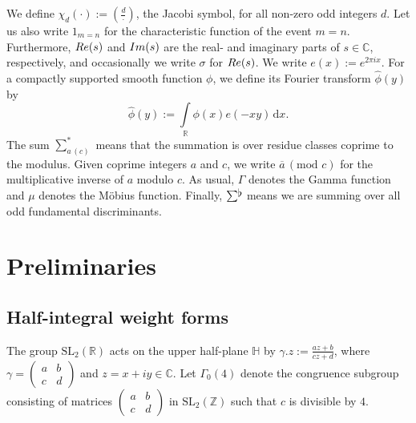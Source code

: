 \documentclass[a4paper,10pt,twoside]{amsart}
\theoremstyle{definition}
\numberwithin{equation}{section}
\newcommand\C{\mathbb{C}}
\renewcommand{\Re}{\textnormal{Re}}
\renewcommand{\Im}{\textnormal{Im}}
\renewcommand\:{\colon}
\newcommand{\sumflat}{\mathop{{\sum}^{\raisebox{-3pt}{\makebox[0pt][l]{$\flat$}}}}}
\begin{document}
We define $\chi_d(\cdot):=\left(\frac d\cdot\right)$, the Jacobi symbol, for all non-zero odd integers $d$. Let us also write $1_{m=n}$ for the characteristic function of the event $m=n$. Furthermore, $\Re(s)$ and $\Im(s)$ are the real- and imaginary parts of $s\in\mathbb C$, respectively, and occasionally we write $\sigma$ for $\Re(s)$. We write $e(x):=e^{2\pi ix}$. For a compactly supported smooth function $\phi$, we define its Fourier transform $\widehat\phi(y)$ by
\[\widehat\phi(y):=\int\limits_\mathbb R \phi(x)e(-xy)\,\mathrm d x. \]
The sum $\sum_{a\,(c)}^*$ means that the summation is over residue classes coprime to the modulus. Given coprime integers $a$ and $c$, we write $\overline a\,(\text{mod } c)$ for the multiplicative inverse of $a$ modulo $c$. As usual, $\Gamma$ denotes the Gamma function and $\mu$ denotes the M\"obius function. Finally, $\sumflat\,\,$ means we are summing over all odd fundamental discriminants. 

\section{Preliminaries}

\subsection{Half-integral weight forms}

\noindent The group $\mathrm{SL}_2(\mathbb R)$ acts on the upper half-plane $\mathbb H$ by $\gamma.z:=\frac{az+b}{cz+d}$, where $\gamma=\begin{pmatrix} a & b\\
c & d
\end{pmatrix}$ and $z=x+iy\in\C$. Let $\Gamma_0(4)$ denote the congruence subgroup consisting of matrices $\begin{pmatrix} a & b\\
c & d
\end{pmatrix}$ in $\mathrm{SL}_2(\mathbb Z)$ such that $c$ is divisible by $4$. 
\end{document}
